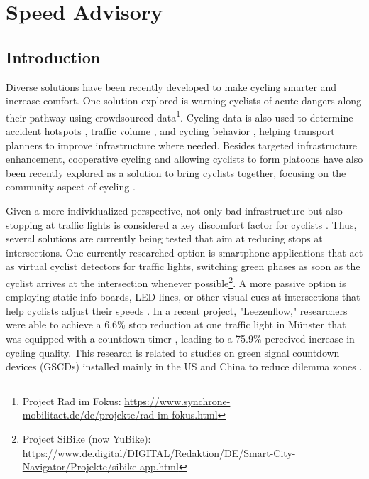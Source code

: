 \chapter{Speed Advisory}\label{ch:app}



\section{Introduction}

Diverse solutions have been recently developed to make cycling smarter and increase comfort. One solution explored is warning cyclists of acute dangers along their pathway using crowdsourced data\footnote{Project Rad im Fokus: \url{https://www.synchrone-mobilitaet.de/de/projekte/rad-im-fokus.html}}. Cycling data is also used to determine accident hotspots \cite{von_stulpnagel_crash_2022}, traffic volume \cite{lissner_modeling_2018}, and cycling behavior \cite{lisner_gps-data_2020}, helping transport planners to improve infrastructure where needed. Besides targeted infrastructure enhancement, cooperative cycling and allowing cyclists to form platoons have also been recently explored as a solution to bring cyclists together, focusing on the community aspect of cycling \cite{cespedes_group_2019, meng_connected_2022}.

Given a more individualized perspective, not only bad infrastructure but also stopping at traffic lights is considered a key discomfort factor for cyclists \cite{otto_framework_2023}. Thus, several solutions are currently being tested that aim at reducing stops at intersections. One currently researched option is smartphone applications that act as virtual cyclist detectors for traffic lights, switching green phases as soon as the cyclist arrives at the intersection whenever possible\footnote{Project SiBike (now YuBike): \url{https://www.de.digital/DIGITAL/Redaktion/DE/Smart-City-Navigator/Projekte/sibike-app.html}}. A more passive option is employing static info boards, LED lines, or other visual cues at intersections that help cyclists adjust their speeds \cite{de_angelis_green_2019}. In a recent project, "Leezenflow," researchers were able to achieve a 6.6\% stop reduction at one traffic light in Münster that was equipped with a countdown timer \cite{brand_riding_2024}, leading to a 75.9\% perceived increase in cycling quality. This research is related to studies on green signal countdown devices (GSCDs) installed mainly in the US and China to reduce dilemma zones \cite{lum_before-and-after_2006, huang_evaluating_2014, ni_estimating_2014, chen_exploring_2015, islam_improved_2016}. 

